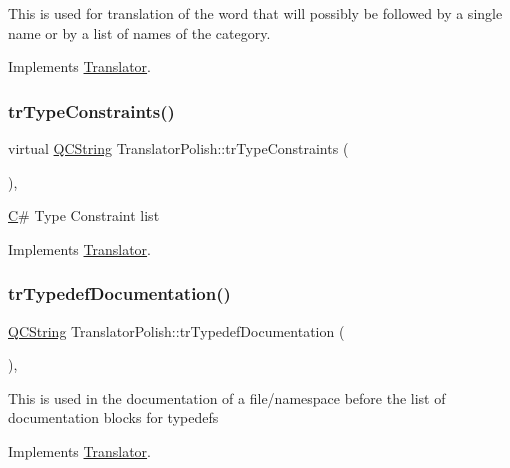 This is used for translation of the word that will possibly be followed by a single name or by a list of names of the category. 

Implements \mbox{\hyperlink{class_translator}{Translator}}.

\mbox{\label{class_translator_polish_afad2b5b53339d2799b233bb29ecdf60f}} 
\subsubsection{\texorpdfstring{trTypeConstraints()}{trTypeConstraints()}}
{\footnotesize\ttfamily virtual \mbox{\hyperlink{class_q_c_string}{Q\+C\+String}} Translator\+Polish\+::tr\+Type\+Constraints (\begin{DoxyParamCaption}{ }\end{DoxyParamCaption})\hspace{0.3cm}{\ttfamily [inline]}, {\ttfamily [virtual]}}

\mbox{\hyperlink{class_c}{C}}\# Type Constraint list 

Implements \mbox{\hyperlink{class_translator}{Translator}}.

\mbox{\label{class_translator_polish_a383494e2858ddb74722dd7dc5ca074a0}} 
\subsubsection{\texorpdfstring{trTypedefDocumentation()}{trTypedefDocumentation()}}
{\footnotesize\ttfamily \mbox{\hyperlink{class_q_c_string}{Q\+C\+String}} Translator\+Polish\+::tr\+Typedef\+Documentation (\begin{DoxyParamCaption}{ }\end{DoxyParamCaption})\hspace{0.3cm}{\ttfamily [inline]}, {\ttfamily [virtual]}}

This is used in the documentation of a file/namespace before the list of documentation blocks for typedefs 

Implements \mbox{\hyperlink{class_translator}{Translator}}.

